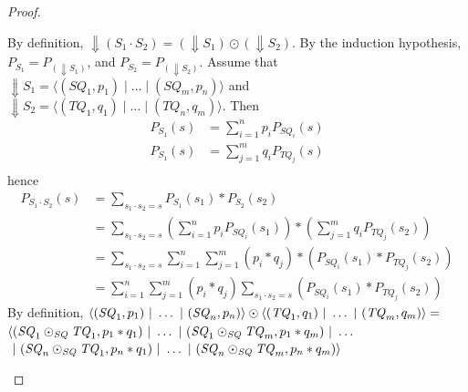 \documentclass[acmsmall,screen,anonymous]{acmart}
\begin{document}
\begin{proof}
\begin{enumerate}
By definition, $\Downarrow (S_1 \cdot S_2) = (\Downarrow S_1) \odot (\Downarrow S_2)$. By the induction hypothesis, $P_{S_1} = P_{(\Downarrow S_1)}$, and $P_{S_2} = P_{(\Downarrow S_2)}$. Assume that $\Downarrow S_1 = \langle (SQ_1,p_1) \; | \; \ldots \; | \; (SQ_m, p_n)\rangle$ and $\Downarrow S_2 = \langle (TQ_1,q_1) \; | \; \ldots \; | \; (TQ_n, q_m) \rangle$. Then
\begin{align*}
P_{S_1}(s) &= \sum_{i=1}^n p_i P_{SQ_i}(s)\\
P_{S_1}(s) &= \sum_{j=1}^m q_i P_{TQ_j}(s)\\
\end{align*}
hence
\begin{align*}
P_{S_1 \cdot S_2}(s) &= \sum_{s_1 \cdot s_2 = s} P_{S_1}(s_1)* P_{S_2}(s_2)\\
&= \sum_{s_1 \cdot s_2 = s} \left(\sum_{i=1}^n p_i P_{SQ_i}(s_1)\right)* \left(\sum_{j=1}^m q_i P_{TQ_j}(s_2)\right)\\
&= \sum_{s_1 \cdot s_2 = s} \sum_{i=1}^n \sum_{j=1}^m (p_i * q_j) * (P_{SQ_i}(s_1) *  P_{TQ_j}(s_2))\\
&= \sum_{i=1}^n \sum_{j=1}^m (p_i * q_j)\sum_{s_1 \cdot s_2 = s} (P_{SQ_i}(s_1) *  P_{TQ_j}(s_2))
\end{align*}
By definition,
$\langle(\mathit{SQ}_1,p_1)~|~\ldots~|~(\mathit{SQ}_n,p_n)\rangle\odot\langle(\mathit{TQ}_1,q_1)~|~\ldots~|~(\mathit{TQ}_m,q_m)\rangle=$\\
      $\langle (\mathit{SQ}_1\odot_{\mathit{SQ}}\mathit{TQ}_1,p_1*q_1)~|~ \ldots
      ~|~
      (\mathit{SQ}_1\odot_{\mathit{SQ}}\mathit{TQ}_m,p_1*q_m)~|~
      \ldots$\\
      $~|~
      (\mathit{SQ}_n\odot_{\mathit{SQ}}\mathit{TQ}_1,p_n*q_1)~|~
      \ldots ~|~
      (\mathit{SQ}_n\odot_{\mathit{SQ}}\mathit{TQ}_m,p_n * q_m) \rangle$
      

\end{enumerate}
\end{proof}
\end{document}
